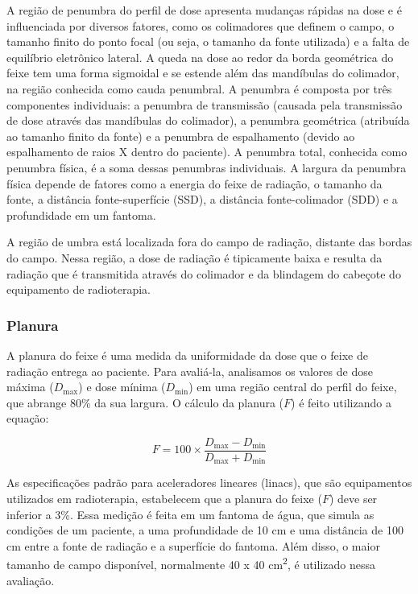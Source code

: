 \documentclass[11pt,a4paper]{article}
\begin{document}
    A região de penumbra do perfil de dose apresenta mudanças rápidas na dose e é influenciada por diversos fatores, como os colimadores que definem o campo, o tamanho finito do ponto focal (ou seja, o tamanho da fonte utilizada) e a falta de equilíbrio eletrônico lateral. A queda na dose ao redor da borda geométrica do feixe tem uma forma sigmoidal e se estende além das mandíbulas do colimador, na região conhecida como cauda penumbral. A penumbra é composta por três componentes individuais: a penumbra de transmissão (causada pela transmissão de dose através das mandíbulas do colimador), a penumbra geométrica (atribuída ao tamanho finito da fonte) e a penumbra de espalhamento (devido ao espalhamento de raios X dentro do paciente). A penumbra total, conhecida como penumbra física, é a soma dessas penumbras individuais. A largura da penumbra física depende de fatores como a energia do feixe de radiação, o tamanho da fonte, a distância fonte-superfície (SSD), a distância fonte-colimador (SDD) e a profundidade em um fantoma.

    A região de umbra está localizada fora do campo de radiação, distante das bordas do campo. Nessa região, a dose de radiação é tipicamente baixa e resulta da radiação que é transmitida através do colimador e da blindagem do cabeçote do equipamento de radioterapia.

\subsubsection*{Planura}

    A planura do feixe é uma medida da uniformidade da dose que o feixe de radiação entrega ao paciente. Para avaliá-la, analisamos os valores de dose máxima ($D_{\text{max}}$) e dose mínima ($D_{\text{min}}$) em uma região central do perfil do feixe, que abrange 80\% da sua largura. O cálculo da planura ($F$) é feito utilizando a equação:

    \begin{equation}
        F = 100 \times \frac{D_{\text{max}} - D_{\text{min}}}{D_{\text{max}} + D_{\text{min}}}
    \end{equation}

    As especificações padrão para aceleradores lineares (linacs), que são equipamentos utilizados em radioterapia, estabelecem que a planura do feixe ($F$) deve ser inferior a 3\%. Essa medição é feita em um fantoma de água, que simula as condições de um paciente, a uma profundidade de 10 cm e uma distância de 100 cm entre a fonte de radiação e a superfície do fantoma. Além disso, o maior tamanho de campo disponível, normalmente 40 x 40 \unit{cm^2}, é utilizado nessa avaliação.
\end{document}
